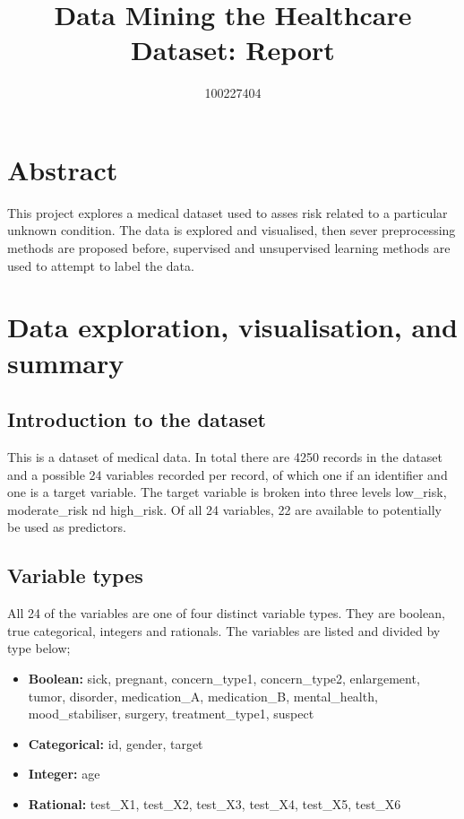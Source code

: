 \documentclass[a4paper]{article}
\begin{document}
\title{Data Mining the Healthcare Dataset: Report}
\author{100227404}
\date{} %
\maketitle

\section{Abstract}
This project explores a medical dataset used to asses risk related to a particular unknown condition. The data is explored and visualised, then sever preprocessing methods are proposed before, supervised and unsupervised learning methods are used to attempt to label the data.

\section{Data exploration, visualisation, and summary} \label{intro}

\subsection*{Introduction to the dataset}

This is a dataset of medical data. In total there are 4250 records in the dataset and a possible 24 variables recorded per record, of which one if an identifier and one is a target variable. The target variable is broken into three levels low\_risk, moderate\_risk nd high\_risk. Of all 24 variables, 22 are available to potentially be used as predictors. 

\subsection*{Variable types}

All 24 of the variables are one of four distinct variable types. They are boolean, true categorical, integers and rationals. The variables are listed and divided by type below;

\begin{itemize}
    \item \textbf{Boolean:} sick, pregnant, concern\_type1, concern\_type2,
                           enlargement, tumor, disorder, medication\_A,
                           medication\_B, mental\_health, mood\_stabiliser, surgery,
                           treatment\_type1, suspect
    \item \textbf{Categorical:} id, gender, target
    \item \textbf{Integer:} age
    \item \textbf{Rational:} test\_X1, test\_X2, test\_X3, test\_X4, test\_X5, test\_X6
\end{itemize}
\end{document}
